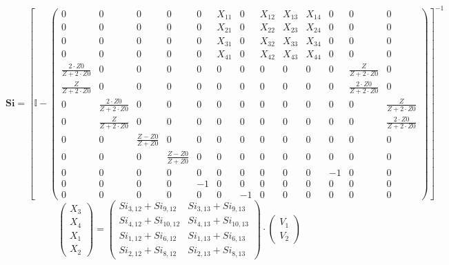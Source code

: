 \documentclass[10pt]{article} \usepackage{amsmath} \usepackage{bbold}
\begin{document}
\[ \mathbf{Si} = \left[ \mathbb{I}  - \left(\begin{smallmatrix} 0 & 0
& 0 & 0 & 0 & X_{11} & 0 & X_{12} & X_{13} & X_{14} & 0 & 0 & 0 \\ 0 &
0 & 0 & 0 & 0 & X_{21} & 0 & X_{22} & X_{23} & X_{24} & 0 & 0 & 0 \\ 0
& 0 & 0 & 0 & 0 & X_{31} & 0 & X_{32} & X_{33} & X_{34} & 0 & 0 & 0 \\
0 & 0 & 0 & 0 & 0 & X_{41} & 0 & X_{42} & X_{43} & X_{44} & 0 & 0 & 0
\\ \frac{2\cdot Z0}{Z+2\cdot Z0} & 0 & 0 & 0 & 0 & 0 & 0 & 0 & 0 & 0 &
0 & \frac{Z}{Z+2\cdot Z0} & 0 \\ \frac{Z}{Z+2\cdot Z0} & 0 & 0 & 0 & 0
& 0 & 0 & 0 & 0 & 0 & 0 & \frac{2\cdot Z0}{Z+2\cdot Z0} & 0 \\ 0 &
\frac{2\cdot Z0}{Z+2\cdot Z0} & 0 & 0 & 0 & 0 & 0 & 0 & 0 & 0 & 0 & 0
& \frac{Z}{Z+2\cdot Z0} \\ 0 & \frac{Z}{Z+2\cdot Z0} & 0 & 0 & 0 & 0 &
0 & 0 & 0 & 0 & 0 & 0 & \frac{2\cdot Z0}{Z+2\cdot Z0} \\ 0 & 0 &
\frac{ Z -Z0}{ Z +Z0} & 0 & 0 & 0 & 0 & 0 & 0 & 0 & 0 & 0 & 0 \\ 0 & 0
& 0 & \frac{ Z -Z0}{ Z +Z0} & 0 & 0 & 0 & 0 & 0 & 0 & 0 & 0 & 0 \\ 0 &
0 & 0 & 0 & 0 & 0 & 0 & 0 & 0 & 0 & -1 & 0 & 0 \\ 0 & 0 & 0 & 0 & -1 &
0 & 0 & 0 & 0 & 0 & 0 & 0 & 0 \\ 0 & 0 & 0 & 0 & 0 & 0 & -1 & 0 & 0 &
0 & 0 & 0 & 0 \end{smallmatrix}\right) \right]^{-1} \]
\[ \left(\begin{array}{c} X_{3} \\ X_{4} \\ X_{1} \\ X_{2}
\end{array}\right)=\left(\begin{smallmatrix} Si_{3,12} + Si_{9,12} &
Si_{3,13} + Si_{9,13} \\ Si_{4,12} + Si_{10,12} & Si_{4,13} +
Si_{10,13} \\ Si_{1,12} + Si_{6,12} & Si_{1,13} + Si_{6,13} \\
Si_{2,12} + Si_{8,12} & Si_{2,13} + Si_{8,13}
\end{smallmatrix}\right)\cdot \left(\begin{array}{c} V_{1} \\ V_{2}
\end{array}\right) \]
\end{document}
